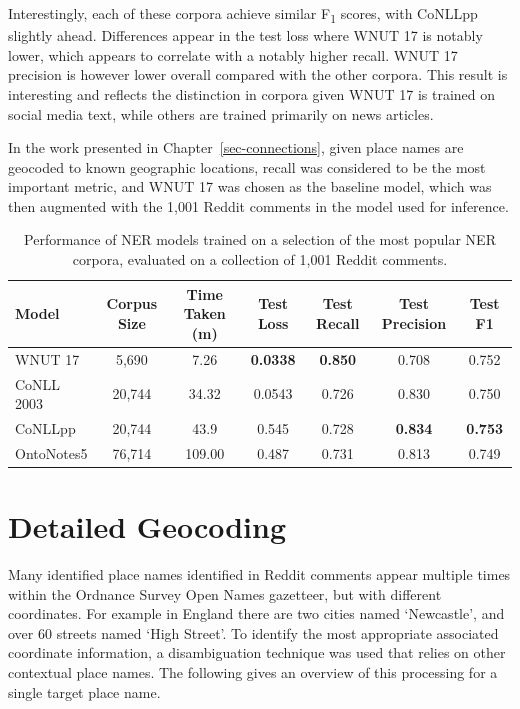 \documentclass[
  letterpaper,
  11pt,
  english,
  onehalfspacing,
  headsepline]{MastersDoctoralThesis}
\begin{document}
Interestingly, each of these corpora achieve similar F\textsubscript{1}
scores, with CoNLLpp slightly ahead. Differences appear in the test loss
where WNUT 17 is notably lower, which appears to correlate with a
notably higher recall. WNUT 17 precision is however lower overall
compared with the other corpora. This result is interesting and reflects
the distinction in corpora given WNUT 17 is trained on social media
text, while others are trained primarily on news articles.

In the work presented in Chapter~\ref{sec-connections}, given place
names are geocoded to known geographic locations, recall was considered
to be the most important metric, and WNUT 17 was chosen as the baseline
model, which was then augmented with the 1,001 Reddit comments in the
model used for inference.

\begin{table}
\caption{\label{tbl-perf} Performance of NER models trained on a selection of the most popular NER corpora, evaluated on a collection of 1,001 Reddit comments.}
\centering
\fontsize{9}{11}\selectfont
\begin{tabular}[t]{lcc|cccc}
\toprule
\textbf{Model} & \textbf{Corpus Size} & \textbf{Time Taken (m)} & \textbf{Test Loss} & \textbf{Test Recall} & \textbf{Test Precision} & \textbf{Test F1} \\
\midrule
WNUT 17 & 5,690 & 7.26 & \textbf{0.0338} & \textbf{0.850} & 0.708 & 0.752 \\
CoNLL 2003 & 20,744 & 34.32 & 0.0543 & 0.726 & 0.830 & 0.750 \\
CoNLLpp & 20,744 & 43.9 & 0.545 & 0.728 & \textbf{0.834} & \textbf{0.753} \\
OntoNotes5 & 76,714 & 109.00 & 0.487 & 0.731 & 0.813 & 0.749 \\
\bottomrule
\end{tabular}
\end{table}

\hypertarget{detailed-geocoding}{%
\section{Detailed Geocoding}\label{detailed-geocoding}}

Many identified place names identified in Reddit comments appear
multiple times within the Ordnance Survey Open Names gazetteer, but with
different coordinates. For example in England there are two cities named
`Newcastle', and over 60 streets named `High Street'. To identify the
most appropriate associated coordinate information, a disambiguation
technique was used that relies on other contextual place names. The
following gives an overview of this processing for a single target place
name.
\end{document}
